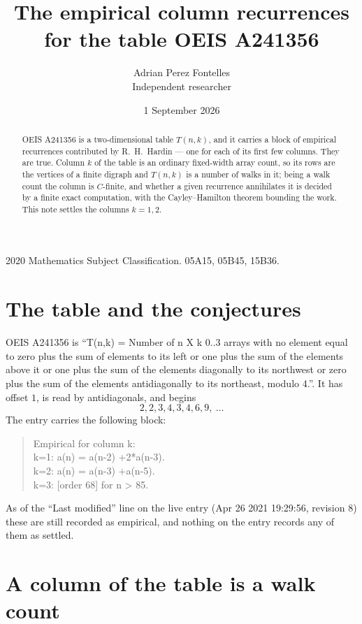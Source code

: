 \documentclass[11pt,a4paper]{article}
\title{The empirical column recurrences for the table OEIS A241356}
\author{Adrian Perez Fontelles\\ \small Independent researcher}
\date{1 September 2026}
\theoremstyle{plain}
\theoremstyle{definition}
\begin{document}
\maketitle

\begin{abstract}
OEIS A241356 is a two-dimensional table $T(n,k)$, and it carries a block of empirical
recurrences contributed by R.~H.~Hardin --- one for each of its first few columns. They are
true. Column $k$ of the table is an ordinary fixed-width array count, so its rows are the
vertices of a finite digraph and $T(n,k)$ is a number of walks in it; being a walk count the
column is $C$-finite, and whether a given recurrence annihilates it is decided by a finite
exact computation, with the Cayley--Hamilton theorem bounding the work. This note settles the columns $k=1, 2$.
\end{abstract}

\noindent\small 2020 Mathematics Subject Classification. 05A15, 05B45, 15B36.\normalsize

\section{The table and the conjectures}

OEIS A241356 is ``T(n,k) = Number of n X k 0..3 arrays with no element equal to zero plus the sum of elements to its left or one plus the sum of the elements above it or one plus the sum of the elements diagonally to its northwest or zero plus the sum of the elements antidiagonally to its northeast, modulo 4.''. It has offset $1$, is
read by antidiagonals, and begins
\[
2, 2, 3, 4, 3, 4, 6, 9,\ \dots
\]
The entry carries the following block:
\begin{quote}\small
Empirical for column k:\\
k=1: a(n) = a(n-2) +2*a(n-3).\\
k=2: a(n) = a(n-3) +a(n-5).\\
k=3: [order 68] for n > 85.\\
\end{quote}
As of the ``Last modified'' line on the live entry (Apr 26 2021 19:29:56, revision 8) these are still
recorded as empirical, and nothing on the entry records any of them as settled.

\section{A column of the table is a walk count}
\end{document}
